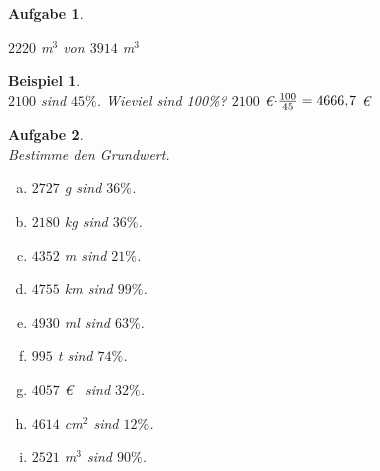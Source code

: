 \documentclass[12pt,fleqn]{article}
\theoremstyle{aufg}
\newtheorem{aufgabe}{Aufgabe}
\theoremstyle{bsp}
\newtheorem{beispiel}{Beispiel}
\begin{document}
\begin{flushleft}
\begin{aufgabe}
\begin{multicols}{3}
\begin{enumerate}[a)]
$2220$ m$^3$ von $3914$ m$^3$
\end{enumerate} 
\end{multicols} 
\end{aufgabe} 
\begin{beispiel} ~ \\ 
$2100$ sind $45\%$. Wieviel sind 100\%? $2100$ \euro$\cdot \frac{100}{45}= 4666,\hspace{-1pt}7$ \euro\end{beispiel} 
\begin{aufgabe} ~ \\ 
Bestimme den Grundwert.\begin{multicols}{3} 
\begin{enumerate}[a)] 
\item 
$2727$ g sind $36\%$.
\item 
$2180$ kg sind $36\%$.
\item 
$4352$ m sind $21\%$.
\item 
$4755$ km sind $99\%$.
\item 
$4930$ ml sind $63\%$.
\item 
$995$ t sind $74\%$.
\item 
$4057$ \euro~ sind $32\%$.
\item 
$4614$ cm$^2$ sind $12\%$.
\item 
$2521$ m$^3$ sind $90\%$.
\end{enumerate} 
\end{multicols} 
\end{aufgabe} 

\end{flushleft}
\end{document}
